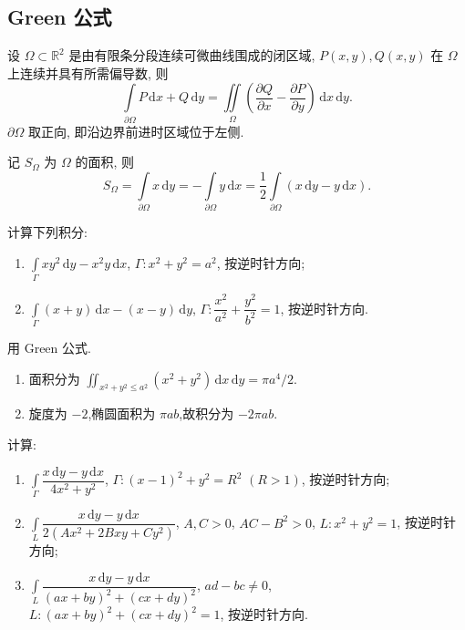 \subsection{Green 公式}

\begin{theorem}
    \leavevmode\par\noindent
    设 $\Omega\subset\mathbb{R}^2$ 是由有限条分段连续可微曲线围成的闭区域, $P(x,y),Q(x,y)$ 在 $\Omega$ 上连续并具有所需偏导数, 则
    \[
        \int\limits_{\partial\Omega}P\,\mathrm{d}x+Q\,\mathrm{d}y
        =\iint\limits_\Omega\left(\dfrac{\partial Q}{\partial x}-\dfrac{\partial P}{\partial y}\right)\,\mathrm{d}x\,\mathrm{d}y.
    \]
    $\partial\Omega$ 取正向, 即沿边界前进时区域位于左侧.
\end{theorem}

\begin{corollary}[\markstar]
    记 $S_\Omega$ 为 $\Omega$ 的面积, 则
    \[
        S_\Omega
        =\int\limits_{\partial\Omega}x\,\mathrm{d}y
        =-\int\limits_{\partial\Omega}y\,\mathrm{d}x
        =\dfrac{1}{2}\int\limits_{\partial\Omega}(x\,\mathrm{d}y-y\,\mathrm{d}x).
    \]
\end{corollary}

\begin{example}
    计算下列积分:
    \begin{enumerate}
        \item $\displaystyle\int\limits_\Gamma xy^2\,\mathrm{d}y-x^2y\,\mathrm{d}x$, $\Gamma:x^2+y^2=a^2$, 按逆时针方向;
        \item $\displaystyle\int\limits_\Gamma(x+y)\,\mathrm{d}x-(x-y)\,\mathrm{d}y$, $\Gamma:\dfrac{x^2}{a^2}+\dfrac{y^2}{b^2}=1$, 按逆时针方向.
    \end{enumerate}
\end{example}
\exampleblank

\begin{solution}
    用 Green 公式.
    \begin{enumerate}
        \item 面积分为 $\iint_{x^2+y^2\leq a^2}(x^2+y^2)\,\mathrm{d}x\,\mathrm{d}y=\pi a^4/2$.
        \item 旋度为 $-2$,椭圆面积为 $\pi ab$,故积分为 $-2\pi ab$.
    \end{enumerate}
\end{solution}

\begin{example}
    计算:
    \begin{enumerate}
        \item $\displaystyle\int\limits_\Gamma\dfrac{x\,\mathrm{d}y-y\,\mathrm{d}x}{4x^2+y^2}$, $\Gamma:(x-1)^2+y^2=R^2$ $(R>1)$, 按逆时针方向;
        \item $\displaystyle\int\limits_L\dfrac{x\,\mathrm{d}y-y\,\mathrm{d}x}{2(Ax^2+2Bxy+Cy^2)}$, $A,C>0$, $AC-B^2>0$, $L:x^2+y^2=1$, 按逆时针方向;
        \item $\displaystyle\int\limits_L\dfrac{x\,\mathrm{d}y-y\,\mathrm{d}x}{(ax+by)^2+(cx+dy)^2}$, $ad-bc\ne0$, $L:(ax+by)^2+(cx+dy)^2=1$, 按逆时针方向.
    \end{enumerate}
\end{example}
\exampleblank

